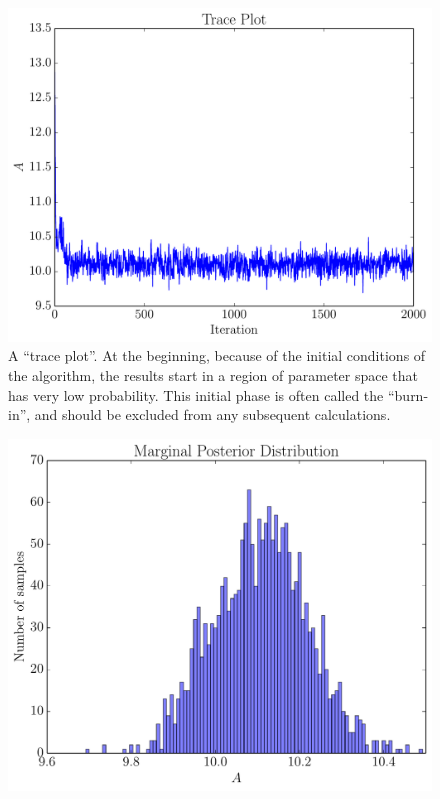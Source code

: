\begin{figure}
\begin{center}
\includegraphics[scale=0.5]{trace_plot.pdf}
\caption{A ``trace plot''. At the beginning, because of the initial conditions
of the algorithm, the results start in a region of parameter space that has
very low probability. This initial phase is often called the ``burn-in'', and
should be excluded from any subsequent calculations.\label{fig:trace_plot}}
\end{center}
\end{figure}

\begin{figure}
\begin{center}
\includegraphics[scale=0.5]{marginal_posterior.pdf}
\caption{\label{fig:marginal_posterior}}
\end{center}
\end{figure}

